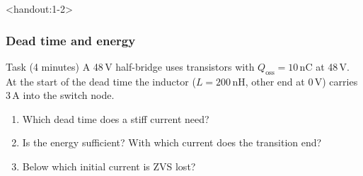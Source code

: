 \begin{frame}<handout:1-2>
	\frametitle{Dead time and energy}
	\begin{block}{Task (4 minutes)}
		A 48\,V half-bridge uses transistors with $Q_\mathrm{oss}=10$\,nC at 48\,V. At the start of the dead time the inductor ($L=200$\,nH, other end at 0\,V) carries 3\,A into the switch node.
		\begin{enumerate}
			\item Which dead time does a stiff current need?
			\item Is the energy sufficient? With which current does the transition end?
			\item Below which initial current is ZVS lost?
		\end{enumerate}
	\end{block}
\end{frame}

